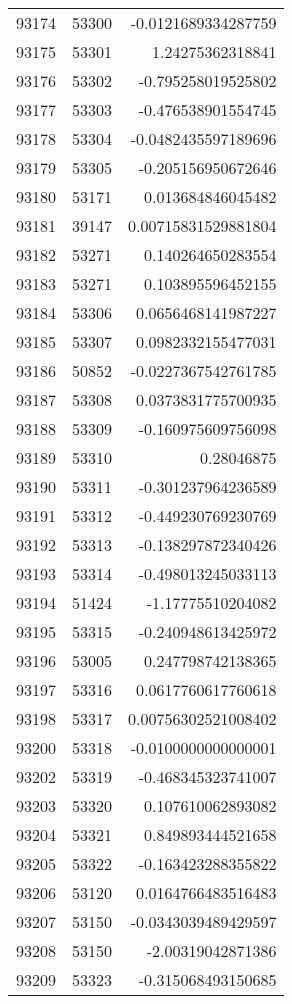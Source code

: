 \begin{tabular}{r | r | r}
93174 & 53300 & -0.0121689334287759 \\
93175 & 53301 & 1.24275362318841 \\
93176 & 53302 & -0.795258019525802 \\
93177 & 53303 & -0.476538901554745 \\
93178 & 53304 & -0.0482435597189696 \\
93179 & 53305 & -0.205156950672646 \\
93180 & 53171 & 0.013684846045482 \\
93181 & 39147 & 0.00715831529881804 \\
93182 & 53271 & 0.140264650283554 \\
93183 & 53271 & 0.103895596452155 \\
93184 & 53306 & 0.0656468141987227 \\
93185 & 53307 & 0.0982332155477031 \\
93186 & 50852 & -0.0227367542761785 \\
93187 & 53308 & 0.0373831775700935 \\
93188 & 53309 & -0.160975609756098 \\
93189 & 53310 & 0.28046875 \\
93190 & 53311 & -0.301237964236589 \\
93191 & 53312 & -0.449230769230769 \\
93192 & 53313 & -0.138297872340426 \\
93193 & 53314 & -0.498013245033113 \\
93194 & 51424 & -1.17775510204082 \\
93195 & 53315 & -0.240948613425972 \\
93196 & 53005 & 0.247798742138365 \\
93197 & 53316 & 0.0617760617760618 \\
93198 & 53317 & 0.00756302521008402 \\
93200 & 53318 & -0.0100000000000001 \\
93202 & 53319 & -0.468345323741007 \\
93203 & 53320 & 0.107610062893082 \\
93204 & 53321 & 0.849893444521658 \\
93205 & 53322 & -0.163423288355822 \\
93206 & 53120 & 0.0164766483516483 \\
93207 & 53150 & -0.0343039489429597 \\
93208 & 53150 & -2.00319042871386 \\
93209 & 53323 & -0.315068493150685 \\

\end{tabular}
